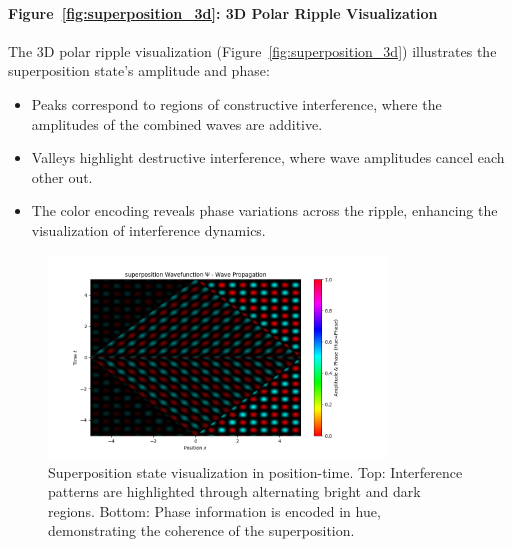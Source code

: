 \documentclass[12pt]{article}
\begin{document}
\paragraph{Figure~\ref{fig:superposition_3d}: 3D Polar Ripple Visualization}
The 3D polar ripple visualization (Figure~\ref{fig:superposition_3d}) illustrates the superposition state’s amplitude and phase:
\begin{itemize}
    \item Peaks correspond to regions of constructive interference, where the amplitudes of the combined waves are additive.
    \item Valleys highlight destructive interference, where wave amplitudes cancel each other out.
    \item The color encoding reveals phase variations across the ripple, enhancing the visualization of interference dynamics.
\end{itemize}

\begin{figure}[H]
\centering
\includegraphics[width=0.8\textwidth]{images/superposition_wavefunction_probability_density_with_phase.png}
\caption{Superposition state visualization in position-time. Top: Interference patterns are highlighted through alternating bright and dark regions. Bottom: Phase information is encoded in hue, demonstrating the coherence of the superposition.}
\label{fig:superposition}
\end{figure}
\end{document}
